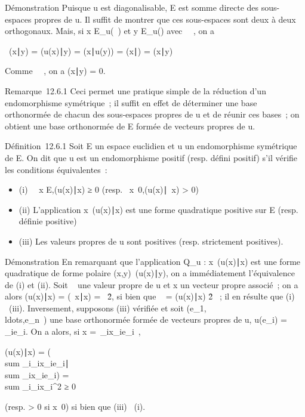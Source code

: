 \documentclass[]{article}
\begin{document}
Démonstration Puisque u est diagonalisable, E est somme directe des
sous-espaces propres de u. Il suffit de montrer que ces sous-espaces
sont deux à deux orthogonaux. Mais, si x \in E_u(\lambda~) et y \in
E_u(\mu) avec \lambda~\neq~\mu, on a

\lambda~(x∣y) = (u(x)\mathrel∣y)
= (x∣u(y)) =
(x∣\muy) = \mu(x\mathrel∣y)

Comme \lambda~\neq~\mu, on a
(x∣y) = 0.

Remarque~12.6.1 Ceci permet une pratique simple de la réduction d'un
endomorphisme symétrique~; il suffit en effet de déterminer une base
orthonormée de chacun des sous-espaces propres de u et de réunir ces
bases~; on obtient une base orthonormée de E formée de vecteurs propres
de u.

Définition~12.6.1 Soit E un espace euclidien et u un endomorphisme
symétrique de E. On dit que u est un endomorphisme positif (resp. défini
positif) s'il vérifie les conditions équivalentes~:

\begin{itemize}
\itemsep1pt\parskip0pt
\item
  (i) \forall~~x \in
  E,(u(x)∣x) ≥ 0 (resp.
  \forall~x\neq~0,(u(x)\mathrel∣~x)
  > 0)
\item
  (ii) L'application
  x\mapsto~(u(x)\mathrel∣x) est
  une forme quadratique positive sur E (resp. définie positive)
\item
  (iii) Les valeurs propres de u sont positives (resp. strictement
  positives).
\end{itemize}

Démonstration En remarquant que l'application Q_u :
x\mapsto~(u(x)\mathrel∣x) est une
forme quadratique de forme polaire
(x,y)\mapsto~(u(x)\mathrel∣y), on
a immédiatement l'équivalence de (i) et (ii). Soit \lambda~ une valeur propre
de u et x un vecteur propre associé~; on a alors
(u(x)∣x) = (\lambda~x\mathrel∣x)
= \lambda~\x\^2,
si bien que \lambda~ = (u(x)∣x)
\over
\x\^2 ~;
il en résulte que (i) \rigtharrow~(iii). Inversement, supposons (iii) vérifiée et
soit
(e_1,\\ldots,e_n~)
une base orthonormée formée de vecteurs propres de u, u(e_i) =
\lambda_ie_i. On a alors, si x =\
\sum  _ix_ie_i~,

(u(x)∣x) = (\\sum
_i\lambda_ix_ie_i∣\\sum
_ix_ie_i) = \\sum
_i\lambda_ix_i^2 ≥ 0

(resp. > 0 si x\neq~0) si bien que
(iii) \rigtharrow~(i).
\end{document}
